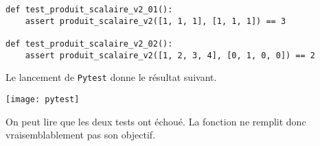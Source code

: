 \begin{lstlisting}
def test_produit_scalaire_v2_01():
    assert produit_scalaire_v2([1, 1, 1], [1, 1, 1]) == 3

def test_produit_scalaire_v2_02():
    assert produit_scalaire_v2([1, 2, 3, 4], [0, 1, 0, 0]) == 2
\end{lstlisting}

Le lancement de \texttt{Pytest} donne le résultat suivant. 

\begin{center}
\texttt{[image: pytest]}
\end{center}


On peut lire que les deux tests ont échoué. La fonction ne remplit donc vraisemblablement pas son objectif. 

